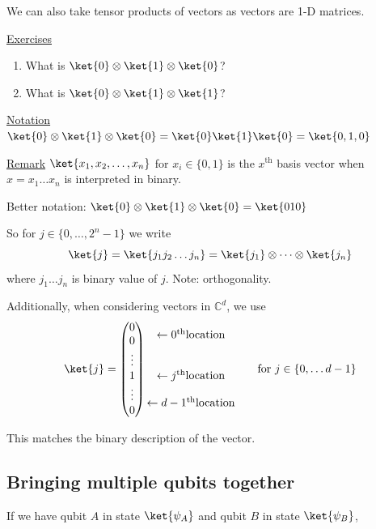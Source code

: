 \documentclass[11pt]{article}
\begin{document}
We can also take tensor products of vectors as vectors are 1-D matrices.

\underline{Exercises}
\begin{enumerate}
    \item[\textcircled{1}] What is $\ket{0}\otimes\ket{1}\otimes\ket{0}$?
    \item[\textcircled{2}] What is $\ket{0}\otimes\ket{1}\otimes\ket{1}$?
\end{enumerate}

\underline{Notation} $\ket{0}\otimes\ket{1}\otimes\ket{0} = \ket{0}\ket{1}\ket{0} = \ket{0,1,0}$

\underline{Remark} $\ket{x_1,x_2,\dots,x_n}$ for $x_i \in \{0,1\}$ is the $x^{\text{th}}$ basis vector when $x = x_1\dots x_n$ is interpreted in binary.

Better notation: $\ket{0}\otimes\ket{1}\otimes\ket{0} = \ket{010}$

So for $j \in \{0,\dots,2^n-1\}$ we write
\[
\ket{j} = \ket{j_1 j_2 \dots j_n} = \ket{j_1}\otimes\dots\otimes\ket{j_n}
\]
where $j_1\dots j_n$ is binary value of $j$. \hfill Note: orthogonality.

Additionally, when considering vectors in $\mathbb{C}^d$, we use
\[
\ket{j} = \begin{pmatrix} 0 \\ 0 \\ \vdots \\ 1 \\ \vdots \\ 0 \end{pmatrix}
\begin{matrix} \leftarrow 0^{\text{th}} \text{location} \\ \\ \\ \leftarrow j^{\text{th}} \text{location} \\ \\ \leftarrow d-1^{\text{th}} \text{location} \end{matrix}
\qquad \text{for } j \in \{0,\dots d-1\}
\]

This matches the binary description of the vector.

\subsection*{Bringing multiple qubits together}

If we have qubit $A$ in state $\ket{\psi_A}$ and qubit $B$ in state $\ket{\psi_B}$,
\end{document}
